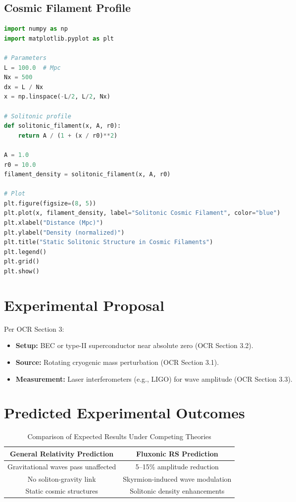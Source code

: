 \documentclass{article}
\begin{document}
\subsection{Cosmic Filament Profile}
\begin{lstlisting}[language=Python, caption=Cosmic Filament Static Profile, label=lst:filament]
import numpy as np
import matplotlib.pyplot as plt

# Parameters
L = 100.0  # Mpc
Nx = 500
dx = L / Nx
x = np.linspace(-L/2, L/2, Nx)

# Solitonic profile
def solitonic_filament(x, A, r0):
    return A / (1 + (x / r0)**2)

A = 1.0
r0 = 10.0
filament_density = solitonic_filament(x, A, r0)

# Plot
plt.figure(figsize=(8, 5))
plt.plot(x, filament_density, label="Solitonic Cosmic Filament", color="blue")
plt.xlabel("Distance (Mpc)")
plt.ylabel("Density (normalized)")
plt.title("Static Solitonic Structure in Cosmic Filaments")
plt.legend()
plt.grid()
plt.show()
\end{lstlisting}

\section{Experimental Proposal}
Per OCR Section 3:
\begin{itemize}
    \item \textbf{Setup:} BEC or type-II superconductor near absolute zero (OCR Section 3.2).
    \item \textbf{Source:} Rotating cryogenic mass perturbation (OCR Section 3.1).
    \item \textbf{Measurement:} Laser interferometers (e.g., LIGO) for wave amplitude (OCR Section 3.3).
\end{itemize}

\section{Predicted Experimental Outcomes}
\begin{table}[h]
    \centering
    \begin{tabular}{|c|c|}
        \hline
        \textbf{General Relativity Prediction} & \textbf{Fluxonic RS Prediction} \\
        \hline
        Gravitational waves pass unaffected & 5–15\% amplitude reduction \\
        No soliton-gravity link & Skyrmion-induced wave modulation \\
        Static cosmic structures & Solitonic density enhancements \\
        \hline
    \end{tabular}
    \caption{Comparison of Expected Results Under Competing Theories}
    \label{tab:predictions}
\end{table}
\end{document}

